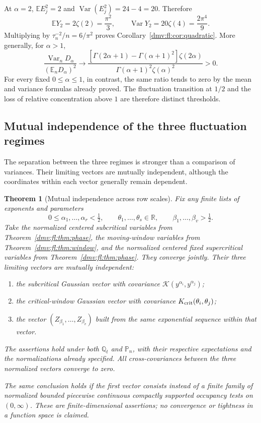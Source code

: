 \documentclass[11pt,letterpaper]{article}
\numberwithin{equation}{section}
\newtheorem{theorem}{Theorem}[section]
\theoremstyle{definition}\newtheorem{definition}[theorem]{Definition}
\theoremstyle{remark}\newtheorem{remark}[theorem]{Remark}
\newcommand{\E}{\mathbb E}
\newcommand{\Pp}{\mathbb P}
\newcommand{\Q}{\mathbb Q}
\DeclareMathOperator{\Var}{Var}
\begin{document}
At $\alpha=2$, $\E E_j^2=2$ and
$\Var(E_j^2)=24-4=20$. Therefore
\[
 \E Y_2=2\zeta(2)=\frac{\pi^2}{3},\qquad
 \Var Y_2=20\zeta(4)=\frac{2\pi^4}{9}.
\]
Multiplying by $\tau_n^{-2}/n=6/\pi^2$ proves
Corollary~\ref{dmv:fl:cor:quadratic}. More generally, for $\alpha>1$,
\begin{equation}\label{dmv:fl:eq:relativevariance}
 \frac{\Var_nD_\alpha}{(\E_nD_\alpha)^2}
 \longrightarrow
 \frac{[\Gamma(2\alpha+1)-\Gamma(\alpha+1)^2]\zeta(2\alpha)}
      {\Gamma(\alpha+1)^2\zeta(\alpha)^2}>0.
\end{equation}
For every fixed $0\le\alpha\le1$, in contrast, the same ratio tends
to zero by the mean and variance formulas already proved. The
fluctuation transition at $1/2$ and the loss of relative concentration
above $1$ are therefore distinct thresholds.

\subsection{Mutual independence of the three fluctuation regimes}
\label{dmv:fl:subsec:mutual-independence}

The separation between the three regimes is stronger than a comparison
of variances. Their limiting vectors are mutually independent, although
the coordinates within each vector generally remain dependent.

\begin{theorem}[Mutual independence across row scales]
\label{dmv:fl:thm:independence}
Fix any finite lists of exponents and parameters
\[
 0\le\alpha_1,\ldots,\alpha_r<\tfrac12,\qquad
 \theta_1,\ldots,\theta_s\in\mathbb R,\qquad
 \beta_1,\ldots,\beta_v>\tfrac12.
\]
Take the normalized centered subcritical variables from
Theorem~\ref{dmv:fl:thm:phase}, the moving-window variables from
Theorem~\ref{dmv:fl:thm:window}, and the normalized centered fixed
supercritical variables from Theorem~\ref{dmv:fl:thm:phase}.
They converge jointly. Their three limiting vectors are mutually
independent:
\begin{enumerate}
\item the subcritical Gaussian vector with covariance
      $\mathcal K(y^{\alpha_i},y^{\alpha_j})$;
\item the critical-window Gaussian vector with covariance
      $K_{\rm crit}(\theta_i,\theta_j)$;
\item the vector $(Z_{\beta_1},\ldots,Z_{\beta_v})$ built from the same
      exponential sequence within that vector.
\end{enumerate}
The assertions hold under both $\Q_t$ and $\Pp_n$, with their respective
expectations and the normalizations already specified.
All cross-covariances between the three normalized vectors converge
to zero.

The same conclusion holds if the first vector consists instead of a
finite family of normalized bounded piecewise continuous compactly
supported occupancy tests on $(0,\infty)$. These are
finite-dimensional assertions; no convergence or tightness in a
function space is claimed.
\end{theorem}
\end{document}
